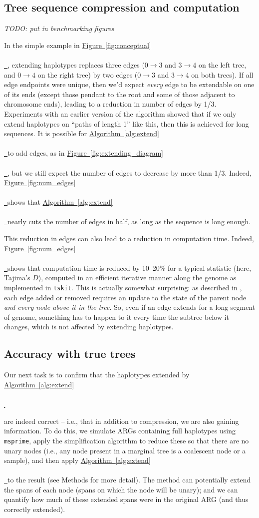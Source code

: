 \documentclass[10pt,twoside,lineno]{gsajnl}
\newcommand{\tskit}{\texttt{tskit}}
\newcommand{\msprime}{\texttt{msprime}}
\newcommand{\comment}[1]{{\color{violet} \it #1}}
\newcommand{\algorithmref}[2][]{%
	\hyperref[{#2}]{%
		Algorithm~\ref*{#2}%
		\ifx\\#1\\%
		\else
		\,#1%
		\fi
	}%
}
\newcommand*{\figref}[2][]{%
	\hyperref[{#2}]{%
		Figure~\ref*{#2}%
		\ifx\\#1\\%
		\else
		\,#1%
		\fi
	}%
}
\begin{document}
\subsection{Tree sequence compression and computation}

\comment{TODO: put in benchmarking figures}

In the simple example in \figref{fig:conceptual},
extending haplotypes replaces three edges
($0 \to 3$ and $3 \to 4$ on the left tree, and $0 \to 4$ on the right tree)
by two edges ($0 \to 3$ and $3 \to 4$ on both trees).
If all edge endpoints were unique, then we'd expect \emph{every} edge to be extendable
on one of its ends
(except those pendant to the root and some of those adjacent to chromosome ends),
leading to a reduction in number of edges by 1/3.
Experiments with an earlier version of the algorithm showed that
if we only extend haplotypes on ``paths of length 1'' like this, 
then this is achieved for long sequences.
It is possible for \algorithmref{alg:extend} to add edges, as in \figref{fig:extending_diagram},
but we still expect the number of edges to decrease by more than 1/3.
Indeed,
\figref{fig:num_edges} shows that \algorithmref{alg:extend} nearly cuts the number of edges
in half, as long as the sequence is long enough.

This reduction in edges can also lead to a reduction in computation time.
Indeed, \figref{fig:num_edges} shows that computation time is reduced by 10--20\%
for a typical statistic (here, Tajima's $D$),
computed in an efficient iterative manner along the genome as implemented in \tskit.
This is actually somewhat surprising:
as described in \citet{ralph2020efficiently},
each edge added or removed requires an update
to the state of the parent node \emph{and every node above it in the tree}.
So, even if an edge extends for a long segment of genome,
something has to happen to it every time the subtree below it changes,
which is not affected by extending haplotypes.

\subsection{Accuracy with true trees}

Our next task is to confirm that the haplotypes extended by \algorithmref{alg:extend}
are indeed correct -- i.e., that in addition to compression, we are also gaining information.
To do this, 
we simulate ARGs containing full haplotypes using \msprime{},
apply the simplification algorithm to reduce these so that there are no unary nodes
(i.e., any node present in a marginal tree is a coalescent node or a sample),
and then apply \algorithmref{alg:extend} to the result
(see Methods for more detail).
The method can potentially extend the spans of each node
(spans on which the node will be unary);
and we can quantify how much of these extended spans were in the original ARG
(and thus correctly extended).
\end{document}
